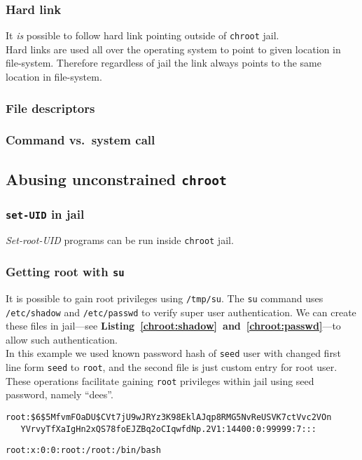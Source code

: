 \documentclass[12pt, a4paper, pdflatex]{article}
\begin{document}
\subsubsection{Hard link}
It \emph{is} possible to follow hard link pointing outside of \texttt{chroot} jail.\\
Hard links are used all over the operating system to point to given location in file-system. Therefore regardless of jail the link always points to the same location in file-system.

\subsubsection{File descriptors}


\subsubsection{Command vs.\ system call}

\subsection{Abusing unconstrained \texttt{chroot}}
\subsubsection{\texttt{set-UID} in jail}
\emph{Set-root-UID} programs can be run inside \texttt{chroot} jail.

\subsubsection{Getting root with \texttt{su}}
It is possible to gain root privileges using \texttt{/tmp/su}. The \texttt{su} command uses \texttt{/etc/shadow} and \texttt{/etc/passwd} to verify super user authentication. We can create these files in jail---see \textbf{Listing~\ref{chroot:shadow}~and~\ref{chroot:passwd}}---to allow such authentication.\\
In this example we used known password hash of \texttt{seed} user with changed first line form \texttt{seed} to \texttt{root}, and the second file is just custom entry for root user.\\
These operations facilitate gaining \texttt{root} privileges within jail using seed password, namely ``dees''.

\vspace{1em}
\begin{lstlisting}
root:$6$5MfvmFOaDU$CVt7jU9wJRYz3K98EklAJqp8RMG5NvReUSVK7ctVvc2VOn
   YVrvyTfXaIgHn2xQS78foEJZBq2oCIqwfdNp.2V1:14400:0:99999:7:::
\end{lstlisting}
\vspace{1em}
\begin{lstlisting}
root:x:0:0:root:/root:/bin/bash
\end{lstlisting}
\end{document}

